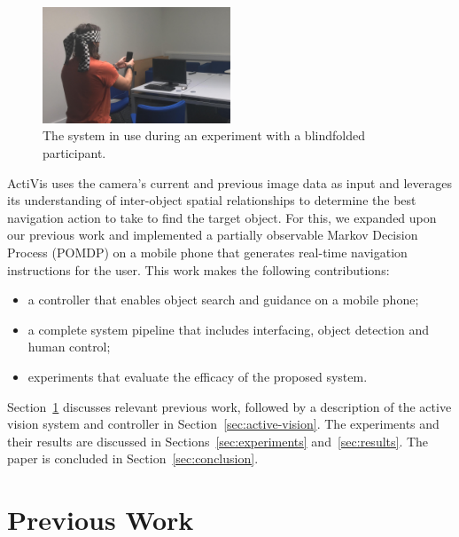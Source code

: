 \documentclass[runningheads]{llncs}
\begin{document}
\begin{figure}
  \centering
  \includegraphics[width=0.5\textwidth]{figures/system_use.png}
  \caption{The system in use during an experiment with a blindfolded participant. }\label{fig:system-in-use}
\end{figure}

ActiVis uses the camera's current and previous image data as input and leverages its understanding of inter-object spatial relationships to determine the best navigation action to take to find the target object.
For this, we expanded upon our previous work and implemented a partially observable Markov Decision Process (POMDP) on a mobile phone that generates real-time navigation instructions for the user.
This work makes the following contributions:

\begin{itemize}
  \item a controller that enables object search and guidance on a mobile phone;
  \item a complete system pipeline that includes interfacing, object detection and human control;
  \item experiments that evaluate the efficacy of the proposed system.
\end{itemize}

Section~\ref{sec:previous-work} discusses relevant previous work, followed by a description of the active vision system and controller in Section~\ref{sec:active-vision}.
The experiments and their results are discussed in Sections~\ref{sec:experiments} and~\ref{sec:results}.
The paper is concluded in Section~\ref{sec:conclusion}.

\section{Previous Work}\label{sec:previous-work}
\end{document}
